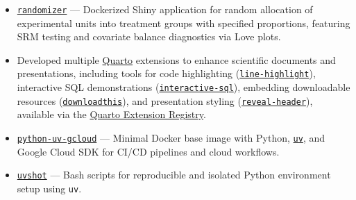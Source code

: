 \documentclass[letterpaper,11pt]{article}
\begin{document}
\begin{itemize}[itemsep=3pt, parsep=0pt, topsep=0pt, leftmargin=*]

  \item \href{https://github.com/shafayetShafee/randomizer}{\texttt{randomizer}} ---
        Dockerized Shiny application for random allocation of experimental units
        into treatment groups with specified proportions, featuring SRM testing
        and covariate balance diagnostics via Love plots.

  \item Developed multiple \href{https://quarto.org/}{Quarto} extensions to
        enhance scientific documents and presentations, including tools for code
        highlighting (\href{https://github.com/shafayetShafee/line-highlight}{\texttt{line-highlight}}),
        interactive SQL demonstrations (\href{https://github.com/shafayetShafee/interactive-sql}{\texttt{interactive-sql}}),
        embedding downloadable resources (\href{https://github.com/shafayetShafee/downloadthis}{\texttt{downloadthis}}),
        and presentation styling (\href{https://github.com/shafayetShafee/reveal-header}{\texttt{reveal-header}}),
        available via the \href{https://quarto.org/docs/extensions/}{Quarto Extension Registry}.

  \item \href{https://github.com/shafayetShafee/python-uv-gcloud}{\texttt{python-uv-gcloud}} ---
        Minimal Docker base image with Python, \href{https://github.com/astral-sh/uv}{\texttt{uv}}, and
        Google Cloud SDK for CI/CD pipelines and cloud workflows.

  \item \href{https://github.com/shafayetShafee/uvshot}{\texttt{uvshot}} ---
        Bash scripts for reproducible and isolated Python environment setup
        using \texttt{uv}.

\end{itemize}


\fi
\end{document}
